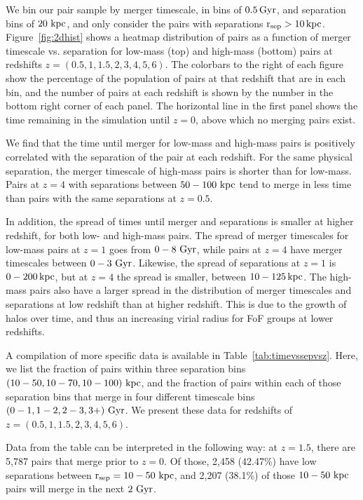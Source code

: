 \documentclass[twocolumn,linenumbers]{aastex631}
\begin{document}
    We bin our pair sample by merger timescale, in bins of $0.5\mathrm{\,Gyr}$, and separation bins of $20\,\mathrm{\,kpc}$, and only consider the pairs with separations $\rm r_{sep}>10\mathrm{\,kpc}$.
    Figure~\ref{fig:2dhist} shows a heatmap distribution of pairs as a function of merger timescale vs. separation for low-mass (top) and high-mass (bottom) pairs at redshifts $z=(0.5,1,1.5,2,3,4,5,6)$. 
    The colorbars to the right of each figure show the percentage of the population of pairs at that redshift that are in each bin, and the number of pairs at each redshift is shown by the number in the bottom right corner of each panel.
    The horizontal line in the first panel shows the time remaining in the simulation until $z=0$, above which no merging pairs exist.
    
    We find that the time until merger for low-mass and high-mass pairs is positively correlated with the separation of the pair at each redshift. 
    For the same physical separation, the merger timescale of high-mass pairs is shorter than for low-mass. 
    Pairs at $z=4$ with separations between $50-100\,\mathrm{\,kpc}$ tend to merge in less time than pairs with the same separations at $z=0.5$. 
    
    In addition, the spread of times until merger and separations is smaller at higher redshift, for both low- and high-mass pairs. 
    The spread of merger timescales for low-mass pairs at $z=1$ goes from $0-8\,\mathrm{\,Gyr}$, while pairs at $z=4$ have merger timescales between $0-3\,\mathrm{\,Gyr}$. 
    Likewise, the spread of separations at $z=1$ is $0-200\mathrm{\,kpc}$, but at $z=4$ the spread is smaller, between $10-125\mathrm{\,kpc}$. 
    The high-mass pairs also have a larger spread in the distribution of merger timescales and separations at low redshift than at higher redshift.
    This is due to the growth of halos over time, and thus an increasing virial radius for FoF groups at lower redshifts. 
    
    
    A compilation of more specific data is available in Table~\ref{tab:timevssepvsz}.
    Here, we list the fraction of pairs within three separation bins $(10-50, 10-70, 10-100)\,\mathrm{\,kpc}$, and the fraction of pairs within each of those separation bins that merge in four different timescale bins $(0-1, 1-2, 2-3, 3+)\,\mathrm{\,Gyr}$.
    We present these data for redshifts of $z=(0.5,1,1.5,2,3,4,5,6)$.
    
    Data from the table can be interpreted in the following way: at $z=1.5$, there are 5,787 pairs that merge prior to $z=0$. 
    Of those, 2,458 (42.47\%) have low separations between $\rm r_{sep}=10-50\,\mathrm{\,kpc}$, and 2,207 (38.1\%) of those $10-50\,\mathrm{\,kpc}$ pairs will merge in the next $2\,\mathrm{\,Gyr}$. 
    
\end{document}
